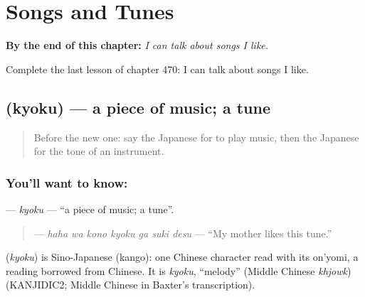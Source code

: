 
\chapter{Songs and Tunes}
\label{ch:ja-songs-and-tunes}

\begin{chapteropening}
\textbf{By the end of this chapter:} \emph{I can talk about songs I like.}

Complete the last lesson of chapter 470: I can talk about songs I like.
\end{chapteropening}

\section[\texorpdfstring{\ja{きょく} (kyoku)}{きょく (kyoku)}]{ (kyoku) — a piece of music; a tune}

\label{lesson:JA-C470-kyoku}



\begin{quote}
Before the new one: say the Japanese for to play music, then the Japanese for the tone of an instrument.
\end{quote}

\subsection*{You'll want to know: }
\textbf{} — \emph{kyoku} — \textquotedblleft{}a piece of music; a tune\textquotedblright{}.

\begin{quote}
\textbf{   } — \emph{haha wa kono kyoku ga suki desu} — \textquotedblleft{}My mother likes this tune.\textquotedblright{}
\end{quote}

\begin{cousinweb}
\textbf{} (\emph{kyoku}) is Sino-Japanese (kango): one Chinese character read with its on'yomi, a reading borrowed from Chinese. It is \emph{kyoku}, \textquotedblleft{}melody\textquotedblright{} (Middle Chinese \emph{khjowk}) (KANJIDIC2; Middle Chinese in Baxter's transcription).
\end{cousinweb}

